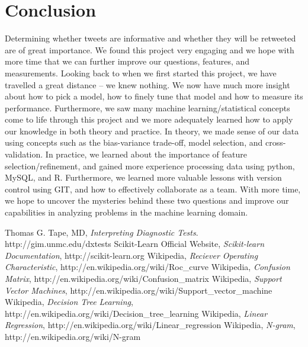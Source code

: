 \documentclass[12pt]{article}
\begin{document}
\section{Conclusion}
Determining whether tweets are informative and whether they will be retweeted are of great importance. We found this project very engaging and we hope with more time that we can further improve our questions, features, and measurements.  Looking back to when we first started this project, we have travelled a great distance -- we knew nothing. We now have much more insight about how to pick a model, how to finely tune that model and how to measure its performance. Furthermore, we saw many machine learning/statistical concepts come to life through this project and we more adequately learned how to apply our knowledge in both theory and practice. In theory, we made sense of our data using concepts such as the bias-variance trade-off, model selection, and cross-validation. In practice, we learned about the importance of feature selection/refinement, and gained more experience processing data using python, MySQL, and R. Furthermore, we learned more valuable lessons with version control using GIT, and how to effectively collaborate as a team. With more time, we hope to uncover the mysteries behind these two questions and improve our capabilities in analyzing problems in the machine learning domain.
\begin{thebibliography}{4}
    Thomas G. Tape, MD,
    \emph{Interpreting Diagnostic Tests}. 
    http://gim.unmc.edu/dxtests
    Scikit-Learn Official Website,
    \emph{Scikit-learn Documentation},
    http://scikit-learn.org
    Wikipedia,
    \emph{Reciever Operating Characteristic},
    http://en.wikipedia.org/wiki/Roc\_curve
    Wikipedia,
    \emph{Confusion Matrix},
    http://en.wikipedia.org/wiki/Confusion\_matrix
    Wikipedia,
    \emph{Support Vector Machines},
    http://en.wikipedia.org/wiki/Support\_vector\_machine
    Wikipedia,
    \emph{Decision Tree Learning},
    http://en.wikipedia.org/wiki/Decision\_tree\_learning
    Wikipedia,
    \emph{Linear Regression},
    http://en.wikipedia.org/wiki/Linear\_regression
    Wikipedia,
    \emph{N-gram},
    http://en.wikipedia.org/wiki/N-gram
\end{thebibliography}
\end{document}
